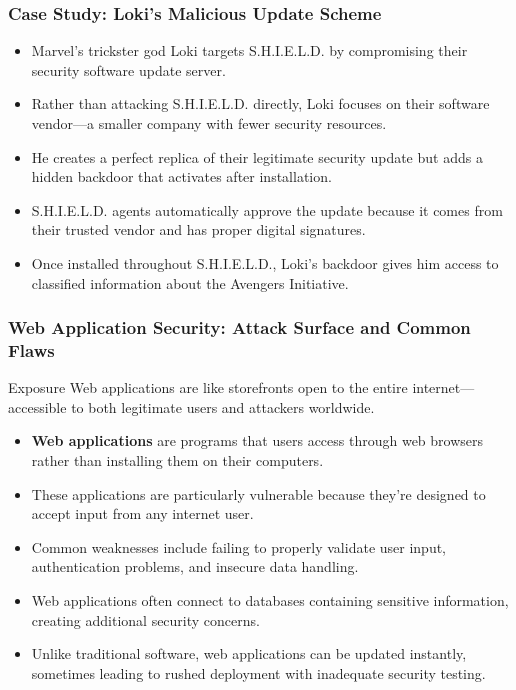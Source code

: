 \documentclass{beamer}
\begin{document}
\begin{frame}
    \frametitle{Case Study: Loki's Malicious Update Scheme}
    
    \begin{itemize}
        \item Marvel's trickster god Loki targets S.H.I.E.L.D. by compromising their security software update server.
        \item Rather than attacking S.H.I.E.L.D. directly, Loki focuses on their software vendor—a smaller company with fewer security resources.
        \item He creates a perfect replica of their legitimate security update but adds a hidden backdoor that activates after installation.
        \item S.H.I.E.L.D. agents automatically approve the update because it comes from their trusted vendor and has proper digital signatures.
        \item Once installed throughout S.H.I.E.L.D., Loki's backdoor gives him access to classified information about the Avengers Initiative.
    \end{itemize}
\end{frame}

\begin{frame}
    \frametitle{Web Application Security: Attack Surface and Common Flaws}
    
    \begin{block}{Exposure}
        Web applications are like storefronts open to the entire internet—accessible to both legitimate users and attackers worldwide.
    \end{block}
    
    \begin{itemize}
        \item \textbf{Web applications} are programs that users access through web browsers rather than installing them on their computers.
        \item These applications are particularly vulnerable because they're designed to accept input from any internet user.
        \item Common weaknesses include failing to properly validate user input, authentication problems, and insecure data handling.
        \item Web applications often connect to databases containing sensitive information, creating additional security concerns.
        \item Unlike traditional software, web applications can be updated instantly, sometimes leading to rushed deployment with inadequate security testing.
    \end{itemize}
\end{frame}
\end{document}
